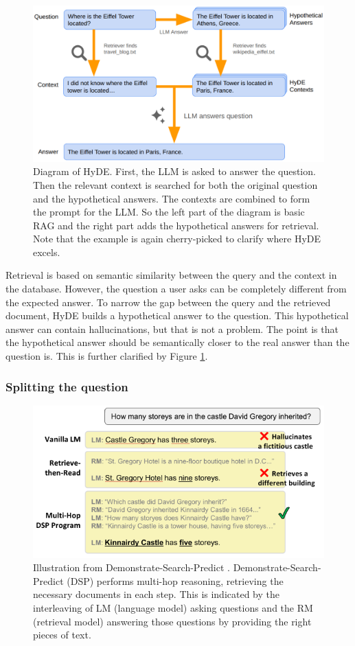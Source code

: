\begin{figure}[h]
	\centering
	\includegraphics[width=0.9\linewidth]{fig/rag_hyde.png}
	\caption{Diagram of HyDE. First, the LLM is asked to answer the question. Then the relevant context is searched for both the original question and the hypothetical answers. The contexts are combined to form the prompt for the LLM. So the left part of the diagram is basic RAG and the right part adds the hypothetical answers for retrieval. Note that the example is again cherry-picked to clarify where HyDE excels.}
	\label{fig:rag_hyde}
\end{figure}

Retrieval is based on semantic similarity between the query and the context in the database. However, the question a user asks can be completely different from the expected answer. To narrow the gap between the query and the retrieved document, HyDE \cite{gao2023precisehyde} builds a hypothetical answer to the question. This hypothetical answer can contain hallucinations, but that is not a problem. The point is that the hypothetical answer should be semantically closer to the real answer than the question is. This is further clarified by Figure \ref{fig:rag_hyde}.

\subsubsection{Splitting the question}

\begin{figure}[h]
	\centering
	\includegraphics[width=0.7\linewidth]{fig/demonstrate_search_predict.png}
	\caption{Illustration from Demonstrate-Search-Predict \cite{khattab2022demonstrate}. Demonstrate-Search-Predict (DSP) performs multi-hop reasoning, retrieving the necessary documents in each step. This is indicated by the interleaving of LM (language model) asking questions and the RM (retrieval model) answering those questions by providing the right pieces of text.}
	\label{fig:demonstrate_search_predict}
\end{figure}


